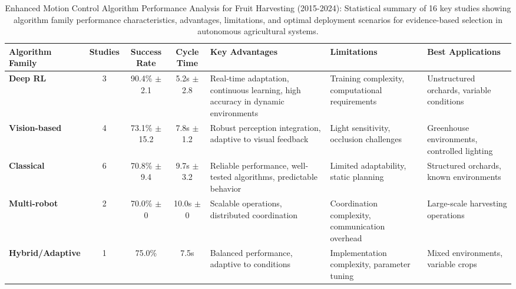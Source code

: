 \documentclass{ieeeaccess}
\begin{document}
\begin{table}[htbp]
\centering
\small
\renewcommand{\arraystretch}{1.2}
\caption{Enhanced Motion Control Algorithm Performance Analysis for Fruit Harvesting (2015-2024): Statistical summary of 16 key studies showing algorithm family performance characteristics, advantages, limitations, and optimal deployment scenarios for evidence-based selection in autonomous agricultural systems.}
\label{tab:motion_control_enhanced}
\begin{tabularx}{\textwidth}{l c c c X X X}
\toprule
\textbf{Algorithm Family} & \textbf{Studies} & \textbf{Success Rate} & \textbf{Cycle Time} & \textbf{Key Advantages} & \textbf{Limitations} & \textbf{Best Applications} \\
\midrule
\textbf{Deep RL} & 3 & 90.4\% $\pm$ 2.1 & 5.2s $\pm$ 2.8 & Real-time adaptation, continuous learning, high accuracy in dynamic environments & Training complexity, computational requirements & Unstructured orchards, variable conditions \\
\midrule
\textbf{Vision-based} & 4 & 73.1\% $\pm$ 15.2 & 7.8s $\pm$ 1.2 & Robust perception integration, adaptive to visual feedback & Light sensitivity, occlusion challenges & Greenhouse environments, controlled lighting \\
\midrule
\textbf{Classical} & 6 & 70.8\% $\pm$ 9.4 & 9.7s $\pm$ 3.2 & Reliable performance, well-tested algorithms, predictable behavior & Limited adaptability, static planning & Structured orchards, known environments \\
\midrule
\textbf{Multi-robot} & 2 & 70.0\% $\pm$ 0 & 10.0s $\pm$ 0 & Scalable operations, distributed coordination & Coordination complexity, communication overhead & Large-scale harvesting operations \\
\midrule
\textbf{Hybrid/Adaptive} & 1 & 75.0\% & 7.5s & Balanced performance, adaptive to conditions & Implementation complexity, parameter tuning & Mixed environments, variable crops \\
\bottomrule
\end{tabularx}
\end{table}
\end{document}
